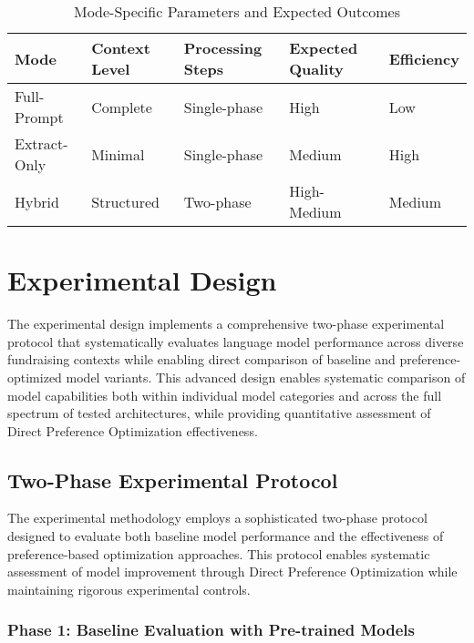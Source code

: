 \begin{table}[htbp]
    \centering
    \caption{Mode-Specific Parameters and Expected Outcomes}
    \label{tab:mode-parameters}
    \begin{tabular}{|l|l|l|l|l|}
    \hline
    \textbf{Mode} & \textbf{Context Level} & \textbf{Processing Steps} & \textbf{Expected Quality} & \textbf{Efficiency} \\
    \hline
    Full-Prompt & Complete & Single-phase & High & Low \\
    Extract-Only & Minimal & Single-phase & Medium & High \\
    Hybrid & Structured & Two-phase & High-Medium & Medium \\
    \hline
    \end{tabular}
\end{table}

\section{Experimental Design}
\label{sec:experimental-design}

The experimental design implements a comprehensive two-phase experimental protocol that systematically evaluates language model performance across diverse fundraising contexts while enabling direct comparison of baseline and preference-optimized model variants. This advanced design enables systematic comparison of model capabilities both within individual model categories and across the full spectrum of tested architectures, while providing quantitative assessment of Direct Preference Optimization effectiveness.

\subsection{Two-Phase Experimental Protocol}

The experimental methodology employs a sophisticated two-phase protocol designed to evaluate both baseline model performance and the effectiveness of preference-based optimization approaches. This protocol enables systematic assessment of model improvement through Direct Preference Optimization while maintaining rigorous experimental controls.

\subsubsection{Phase 1: Baseline Evaluation with Pre-trained Models}

